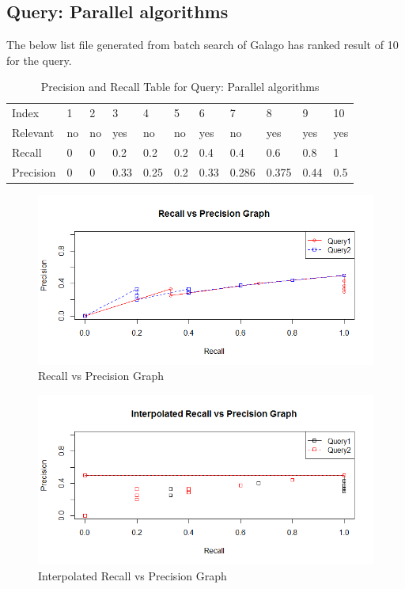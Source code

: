 \documentclass[12pt]{report}
\begin{document}
\subsection{Query: Parallel algorithms}

The below list file generated from batch search of Galago has ranked result of 10 for the query.


\begin{table}[]
\centering
\caption{Precision and Recall Table for Query: Parallel algorithms }
\label{my-label}
\begin{tabular}{lllllllllll}
Index     & 1   & 2     & 3     & 4     & 5     & 6     & 7     & 8     & 9    & 10  \\
Relevant  & no  & no   & yes   & no   & no   & yes   & no    & yes   & yes  & yes  \\
Recall    & 0 & 0 & 0.2 & 0.2 & 0.2 & 0.4 & 0.4 & 0.6 & 0.8    & 1   \\
Precision & 0 & 0   & 0.33  & 0.25  & 0.2   & 0.33 & 0.286 & 0.375  & 0.44 & 0.5
\end{tabular}
\end{table}

\begin{figure}[ht]
  \centering
  \includegraphics[width=1\textwidth]{Problem8_4/RecallvsPrecision.png}
  \caption{Recall vs Precision Graph}
  \label{fig:1}
\end{figure} 

\begin{figure}[ht]
  \centering
  \includegraphics[width=1\textwidth]{Problem8_4/InterpolatedRecallvsPrecision.png}
  \caption{Interpolated Recall vs Precision Graph}
  \label{fig:1}
\end{figure}
\end{document}
